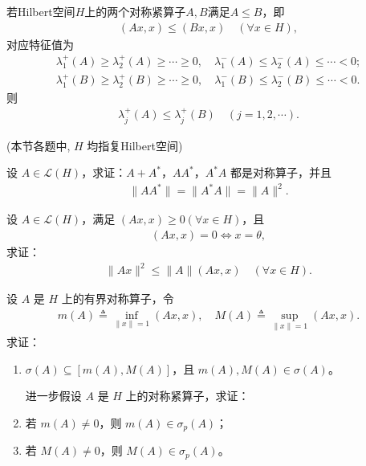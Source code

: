 \documentclass[../../main.tex]{subfiles}%
\begin{document}
\begin{corollary}
若Hilbert空间$H$上的两个对称紧算子$A,B$满足$A\leqslant B$，即
\begin{align*}
(Ax,x)\leqslant(Bx,x)\quad(\forall x\in H),
\end{align*}
对应特征值为
\begin{gather*}
\lambda _{1}^{+}\left( A \right) \geqslant \lambda _{2}^{+}\left( A \right) \geqslant \cdots \geqslant 0,\quad \lambda _{1}^{-}\left( A \right) \leqslant \lambda _{2}^{-}\left( A \right) \leqslant \cdots <0;
\\
\lambda _{1}^{+}\left( B \right) \geqslant \lambda _{2}^{+}\left( B \right) \geqslant \cdots \geqslant 0,\quad \lambda _{1}^{-}\left( B \right) \leqslant \lambda _{2}^{-}\left( B \right) \leqslant \cdots <0.
\end{gather*}
则
\begin{align*}
\lambda_j^+(A)\leqslant\lambda_j^+(B)\quad(j=1,2,\cdots).
\end{align*}
\end{corollary}


(本节各题中, $H$ 均指复Hilbert空间)

\begin{example}
设 $A \in \mathscr{L}(H)$，求证：$A+A^*$，$AA^*$，$A^*A$ 都是对称算子，并且
\begin{align*}
\|AA^*\| = \|A^*A\| = \|A\|^2.
\end{align*}
\end{example}

\begin{example}
设 $A \in \mathscr{L}(H)$，满足 $(Ax,x) \geqslant 0(\forall x \in H)$，且
\begin{align*}
(Ax,x) = 0 \iff x = \theta,
\end{align*}
求证：
\begin{align*}
\|Ax\|^2 \leqslant \|A\|(Ax,x) \quad (\forall x \in H).
\end{align*}
\end{example}

\begin{example}
设 $A$ 是 $H$ 上的有界对称算子，令
\begin{align*}
m(A) \triangleq \inf\limits_{\|x\|=1} (Ax,x), \quad M(A) \triangleq \sup\limits_{\|x\|=1} (Ax,x).
\end{align*}
求证：
\begin{enumerate}[(1)]
\item $\sigma(A) \subseteq [m(A),M(A)]$，且 $m(A), M(A) \in \sigma(A)$。

进一步假设 $A$ 是 $H$ 上的对称紧算子，求证：
\item 若 $m(A) \neq 0$，则 $m(A) \in \sigma_p(A)$；
\item 若 $M(A) \neq 0$，则 $M(A) \in \sigma_p(A)$。
\end{enumerate}
\end{example}
\end{document}
